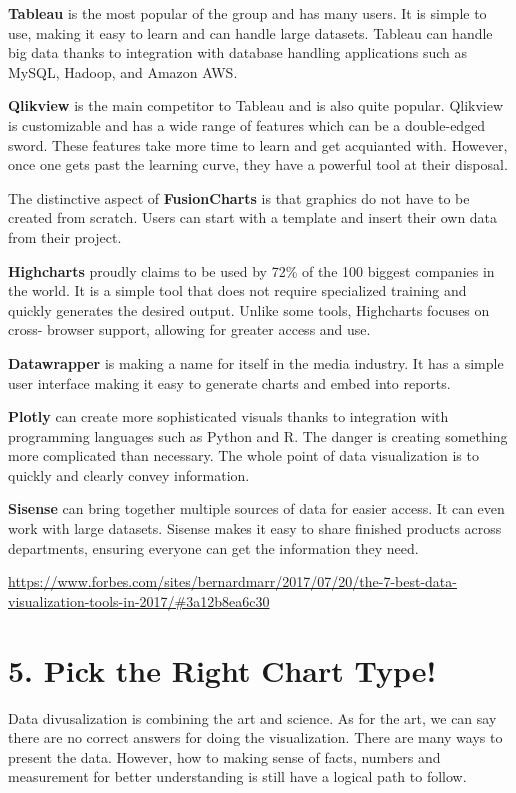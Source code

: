 \documentclass[]{book}
\theoremstyle{definition}
\theoremstyle{definition}
\theoremstyle{definition}
\theoremstyle{remark}
\begin{document}
\textbf{Tableau} is the most popular of the group and has many users. It
is simple to use, making it easy to learn and can handle large datasets.
Tableau can handle big data thanks to integration with database handling
applications such as MySQL, Hadoop, and Amazon AWS.

\textbf{Qlikview} is the main competitor to Tableau and is also quite
popular. Qlikview is customizable and has a wide range of features which
can be a double-edged sword. These features take more time to learn and
get acquianted with. However, once one gets past the learning curve,
they have a powerful tool at their disposal.

The distinctive aspect of \textbf{FusionCharts} is that graphics do not
have to be created from scratch. Users can start with a template and
insert their own data from their project.

\textbf{Highcharts} proudly claims to be used by 72\% of the 100 biggest
companies in the world. It is a simple tool that does not require
specialized training and quickly generates the desired output. Unlike
some tools, Highcharts focuses on cross- browser support, allowing for
greater access and use.

\textbf{Datawrapper} is making a name for itself in the media industry.
It has a simple user interface making it easy to generate charts and
embed into reports.

\textbf{Plotly} can create more sophisticated visuals thanks to
integration with programming languages such as Python and R. The danger
is creating something more complicated than necessary. The whole point
of data visualization is to quickly and clearly convey information.

\textbf{Sisense} can bring together multiple sources of data for easier
access. It can even work with large datasets. Sisense makes it easy to
share finished products across departments, ensuring everyone can get
the information they need.

\url{https://www.forbes.com/sites/bernardmarr/2017/07/20/the-7-best-data-visualization-tools-in-2017/\#3a12b8ea6c30}

\section{5. Pick the Right Chart Type!}\label{pick-the-right-chart-type}

Data divusalization is combining the art and science. As for the art, we
can say there are no correct answers for doing the visualization. There
are many ways to present the data. However, how to making sense of
facts, numbers and measurement for better understanding is still have a
logical path to follow.
\end{document}
